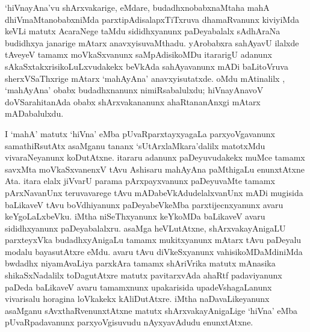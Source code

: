`hiVnayAna'vu shArxvakarige, eMdare, budadhxnobabxnaMtaha mahA dhiVmaMta\-nobabxniMda parxtipAdisalapxTiTxruva dhamaRvanunx kiviyiMda keVLi matutx AcaraNege taMdu sididhxyanunx paDeyabalalx sAdhAraNa budidhxya janarige mAtarx anavxyisuvaMthadu. yArobabxra sahAyavU ilalxde tAveyeV tamamx moVkaSxvanunx saMpAdisikoMDu itararigU adanunx sAkaSxtakxrisikoLuLxvudakekx beVkAda sahAyavanunx mADi baLitoVruva sherxVSaThxrige mAtarx `mahAyAna' anavxyisutatxde. oMdu mAtinalilx , `mahAyAna' obabx budadhxnanunx nimiRsabalulxdu; hiVnayAnavoV doVSarahitanAda obabx shArxvakananunx ahaRtananAnxgi mAtarx mADabalulxdu.

I `mahA' matutx `hiVna' eMba pUvaRparxtayxyagaLa parxyoVgavanunx samathiRsutAtx asaMganu tananx `sUtArxlaMkara'dalilx matotxMdu vivaraNeyanunx koDutAtxne. itararu adanunx paDeyuvudakekx muMce tamamx savxMta moVkaSxvanenxV tAvu Ashisaru mahAyAna paMthigaLu enunxtAtxne Ata. itara elalx jiVvarU parama pArxpayxvanunx paDeyuvaMte tamamx pArxNavanUnx teruvavarege tAvu mADabeVkAdudelalxvanUnx mADi mugisida baLikaveV tAvu boVdhiyanunx paDeyabeVkeMba parxtijecnxyanunx avaru keYgoLaLxbeVku. iMtha niSeThxyanunx keYkoMDa baLikaveV avaru sididhxyanunx paDeyabalalxru. asaMga heVLutAtxne, shArxvakayAnigaLU parxteyxVka budadhxyAnigaLu tamamx
mukitxyanunx mAtarx tAvu paDeyalu modalu bayasutAtxre eMdu. avaru tAvu diVkeSxyanunx vahisikoMDaMdiniMda bwdadhx niyamAvaLiya parxkAra tamamx shAriVrika matutx mAnasika shikaSxNadalilx toDagutAtxre matutx pavitarxvAda ahaRtf padaviyanunx paDeda baLikaveV avaru tamamxnunx upakarisida upadeVshagaLanunx vivarisalu horagina loVkakekx kAliDutAtxre. iMtha naDavaLikeyanunx asaMganu sAvxthaRvenunxtAtxne matutx shArxvakayAnigaLige `hiVna' eMba pUvaRpadavanunx parxyoVgisuvudu nAyxyavAdudu enunxtAtxne.

